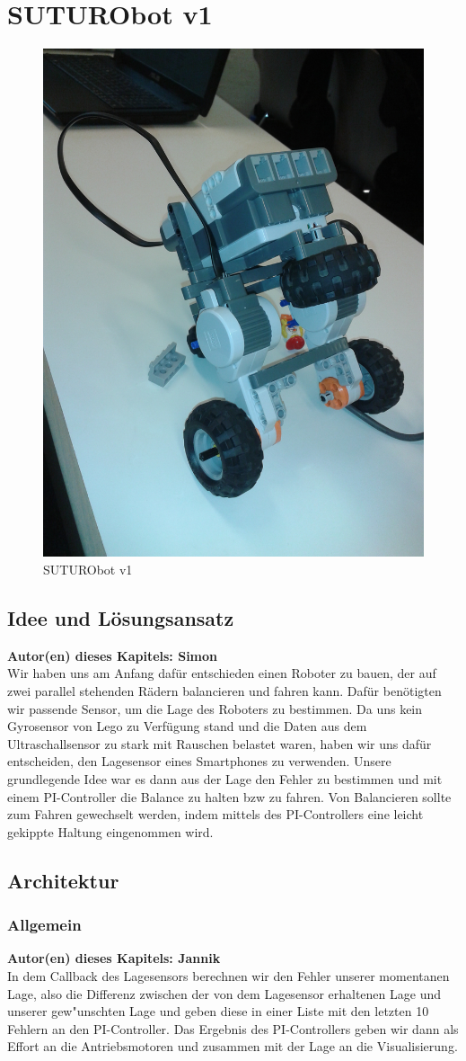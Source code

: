 \documentclass[8pt]{article}
\newcommand{\secauthor}[1]{\textbf{Autor(en) dieses Kapitels: {#1}}\\}
\begin{document}
\section{SUTURObot v1}
\begin{figure}[h]
  \begin{center}
    \includegraphics[width=.5\textwidth]{pictures/SUTURObot-v1.jpg}  
  \end{center}
  \caption{SUTURObot v1}
  \label{fig:SUTURObot1}
\end{figure}

\subsection{Idee und Lösungsansatz} 
\secauthor{Simon}
Wir haben uns am Anfang dafür entschieden einen Roboter zu bauen, der auf zwei parallel stehenden Rädern balancieren und fahren kann. Dafür benötigten wir passende Sensor, um die Lage des Roboters zu bestimmen. Da uns kein Gyrosensor von Lego zu Verfügung stand und die Daten aus dem Ultraschallsensor zu stark mit Rauschen belastet waren, haben wir uns dafür entscheiden, den Lagesensor eines Smartphones zu verwenden. Unsere grundlegende Idee war es dann aus der Lage den Fehler zu bestimmen und mit einem PI-Controller die Balance zu halten bzw zu fahren. Von Balancieren sollte zum Fahren gewechselt werden, indem mittels des PI-Controllers eine leicht gekippte Haltung eingenommen wird.

\subsection{Architektur}

\subsubsection{Allgemein} 
\secauthor{Jannik}
In dem Callback des Lagesensors berechnen wir den Fehler unserer momentanen Lage, also die Differenz zwischen der von dem Lagesensor erhaltenen Lage und unserer gew"unschten Lage und geben diese in einer Liste mit den letzten 10 Fehlern an den PI-Controller. Das Ergebnis des PI-Controllers geben wir dann als Effort an die Antriebsmotoren und zusammen mit der Lage an die Visualisierung.
\end{document}
